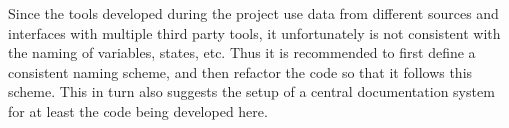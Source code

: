 Since the tools developed during the project use data from different sources and interfaces with multiple third party tools, it unfortunately is not consistent with the naming of variables, states, etc. Thus it is recommended to first define a consistent naming scheme, and then refactor the code so that it follows this scheme. This in turn also suggests the setup of a central documentation system for at least the code being developed here. 



